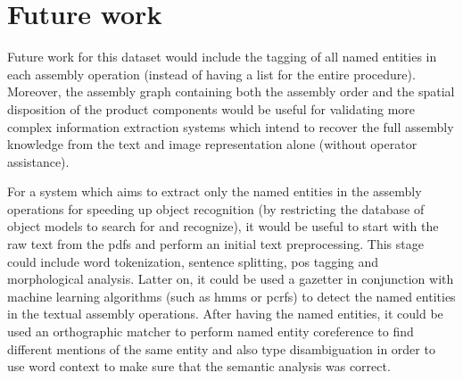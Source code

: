 \section{Future work}\label{sec:future-work}

Future work for this dataset would include the tagging of all named entities in each assembly operation (instead of having a list for the entire procedure). Moreover, the assembly graph containing both the assembly order and the spatial disposition of the product components would be useful for validating more complex information extraction systems which intend to recover the full assembly knowledge from the text and image representation alone (without operator assistance).

For a system which aims to extract only the named entities in the assembly operations for speeding up object recognition (by restricting the database of object models to search for and recognize), it would be useful to start with the raw text from the \glspl{pdf} and perform an initial text preprocessing. This stage could include word tokenization, sentence splitting, \gls{pos} tagging and morphological analysis. Latter on, it could be used a gazetter in conjunction with machine learning algorithms (such as \glspl{hmm} or \glspl{pcrf}) to detect the named entities in the textual assembly operations. After having the named entities, it could be used an orthographic matcher to perform named entity coreference to find different mentions of the same entity and also type disambiguation in order to use word context to make sure that the semantic analysis was correct.
